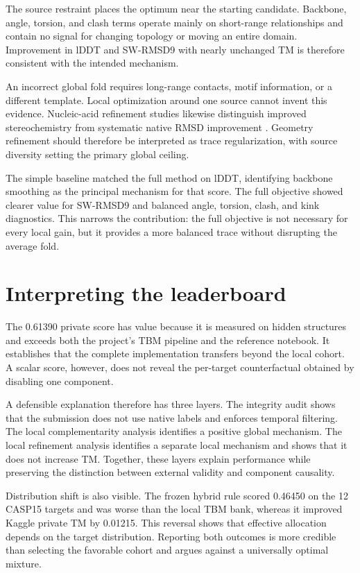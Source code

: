 \documentclass[12pt,a4paper,oneside]{report}
\begin{document}
The source restraint places the optimum near the starting candidate. Backbone, angle,
torsion, and clash terms operate mainly on short-range relationships and contain no
signal for changing topology or moving an entire domain. Improvement in lDDT and
SW-RMSD9 with nearly unchanged TM is therefore consistent with the intended mechanism.

An incorrect global fold requires long-range contacts, motif information, or a different
template. Local optimization around one source cannot invent this evidence. Nucleic-acid
refinement studies likewise distinguish improved stereochemistry from systematic native
RMSD improvement \cite{qrnas}. Geometry refinement should therefore be interpreted as
trace regularization, with source diversity setting the primary global ceiling.

The simple baseline matched the full method on lDDT, identifying backbone smoothing as
the principal mechanism for that score. The full objective showed clearer value for
SW-RMSD9 and balanced angle, torsion, clash, and kink diagnostics. This narrows the
contribution: the full objective is not necessary for every local gain, but it provides
a more balanced trace without disrupting the average fold.

\section{Interpreting the leaderboard}

The 0.61390 private score has value because it is measured on hidden structures and
exceeds both the project's TBM pipeline and the reference notebook. It establishes that
the complete implementation transfers beyond the local cohort. A scalar score, however,
does not reveal the per-target counterfactual obtained by disabling one component.

A defensible explanation therefore has three layers. The integrity audit shows that the
submission does not use native labels and enforces temporal filtering. The local
complementarity analysis identifies a positive global mechanism. The local refinement
analysis identifies a separate local mechanism and shows that it does not increase TM.
Together, these layers explain performance while preserving the distinction between
external validity and component causality.

Distribution shift is also visible. The frozen hybrid rule scored 0.46450 on the 12
CASP15 targets and was worse than the local TBM bank, whereas it improved Kaggle private
TM by 0.01215. This reversal shows that effective allocation depends on the target
distribution. Reporting both outcomes is more credible than selecting the favorable
cohort and argues against a universally optimal mixture.
\end{document}
